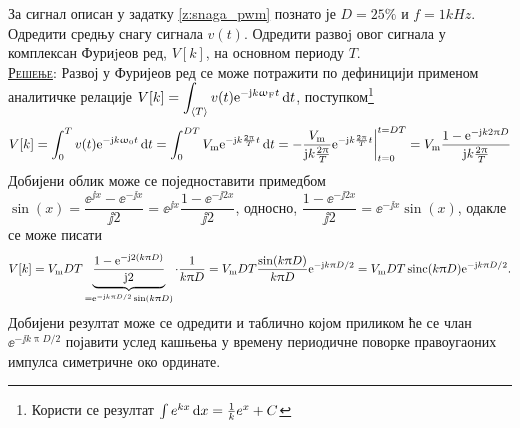 \PID 
За сигнал описан у задатку \ref{z:snaga_pwm} познато је 
$D = 25\%$ и $f = 1\unit{kHz}$. Одредити средњу снагу сигнала $v(t)$.
Одредити развоj овог сигнала у комплексан Фуриjеов ред, $V[k]$, на основном периоду $T$.
\\[2mm]

\textsc{\underline{Решење}}: Развој у Фуријеов ред се може потражити по дефиницији применом 
аналитичке релације 
$\displaystyle V[k] = \int_{\langle T \rangle} v(t) {\rm e}^{-{\rm j} k \upomega_{\rm F} t} \, {\rm d} t$, 
поступком\footnote{Користи се резултат $\int e^{kx} \, {\rm d} x = \frac{1}{k} e^x + C$}
\begin{align}
    V[k] = \int_{0}^T v(t) {\rm e}^{-{\rm j} k \upomega_{\rm 0} t} \, {\rm d} t 
         = \int_{0}^{DT}  V_{\rm m} {\rm e}^{-{\rm j} k \frac{2\uppi}{T} t} \, {\rm d} t
         = -\dfrac{V_{\rm m}}{{\rm j} k \frac{2\uppi}{T}} 
         {\rm e}^{-{\rm j} k \frac{2\uppi}{T} t}\bigg|_{t = 0}^{t = DT}
         = V_{\rm m}\dfrac{
            1
            -
            {\rm e}^{-{\rm j} k 2\uppi D}
         }{{\rm j} k \frac{2\uppi}{T}} 
\end{align}
Добијени облик може се поједноставити примедбом 
$\sin(x) = \dfrac{\ee^{\jj x} - \ee^{-\jj x}}{\jj 2} = \ee^{\jj x} \dfrac{1 - \ee^{-\jj 2x}}{\jj 2}$,
односно, 
$\dfrac{1 - \ee^{-\jj 2x}}{\jj 2} = \ee^{-\jj x} \sin(x) $,
одакле се може писати
\begin{align}
    V[k] = V_{\rm m}DT 
     \underbrace{
     \dfrac{
        1
        -
        {\rm e}^{-{\rm j} 2 (k \uppi D) }
     }{{\rm j} 2 }}_{ = {\rm e}^{-{\rm j} k \uppi D/2} \sin(k\uppi D) }
     \cdot 
     \dfrac{1}{k \uppi D} 
     = V_{\rm m} D T \dfrac{\sin(k\uppi D)}{k\uppi D} {\rm e}^{-{\rm j} k \uppi D/2} 
     = V_{\rm m} D T \operatorname{sinc}(k \uppi D) {\rm e}^{-{\rm j} k \uppi D/2}.
\end{align}
Добијени резултат може се одредити и таблично којом приликом ће се члан 
$\ee^{-\jj k \uppi D/2}$ појавити услед кашњења у времену периодичне поворке правоугаоних 
импулса симетричне око ординате. 
